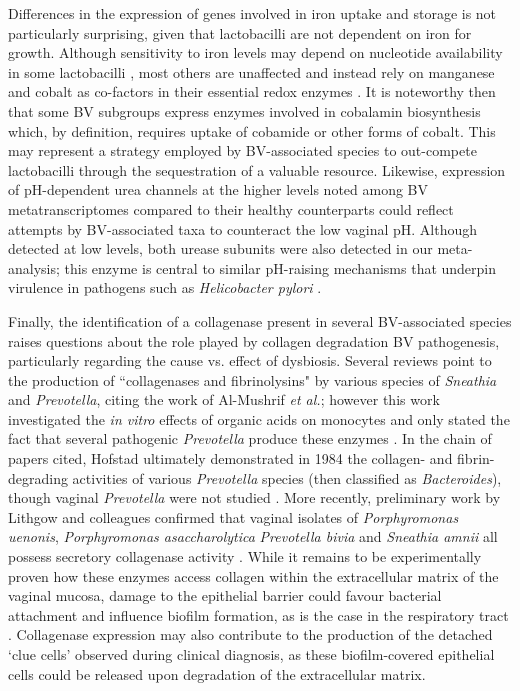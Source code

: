 \documentclass[sn-mathphys,Numbered]{sn-jnl}%
\begin{document}
Differences in the expression of genes involved in iron uptake and storage is not particularly surprising, given that lactobacilli are not dependent on iron for growth. Although sensitivity to iron levels may depend on nucleotide availability in some lactobacilli \citep{elli_iron_2000}, most others are unaffected and instead rely on manganese and cobalt as co-factors in their essential redox enzymes \citep{weinberg_lactobacillus_1997}. It is noteworthy then that some BV subgroups express enzymes involved in cobalamin biosynthesis which, by definition, requires uptake of cobamide or other forms of cobalt. This may represent a strategy employed by BV-associated species to out-compete lactobacilli through the sequestration of a valuable resource. Likewise, expression of pH-dependent urea channels at the higher levels noted among BV metatranscriptomes compared to their healthy counterparts could reflect attempts by BV-associated taxa to counteract the low vaginal pH. Although detected at low levels, both urease subunits were also detected in our meta-analysis; this enzyme is central to similar pH-raising mechanisms that underpin virulence in pathogens such as \textit{Helicobacter pylori} \citep{strugatsky_structure_2013}.

Finally, the identification of a collagenase present in several BV-associated species raises questions about the role played by collagen degradation BV pathogenesis, particularly regarding the cause vs. effect of dysbiosis. Several reviews \citep{onderdonk_human_2020,africa_anaerobes_2014} point to the production of ``collagenases and fibrinolysins" by various species of \textit{Sneathia} and \textit{Prevotella}, citing the work of Al-Mushrif \textit{et al.}; however this work investigated the \textit{in vitro} effects of organic acids on monocytes and only stated the fact that several pathogenic \textit{Prevotella} produce these enzymes \citep{al-mushrif_inhibition_2000}. In the chain of papers cited, Hofstad ultimately demonstrated in 1984 the collagen- and fibrin-degrading activities of various \textit{Prevotella} species (then classified as \textit{Bacteroides}), though vaginal \textit{Prevotella} were not studied \citep{hofstad_pathogenicity_1984}. More recently, preliminary work by Lithgow and colleagues confirmed that vaginal isolates of \textit{Porphyromonas uenonis}, \textit{{Porphyromonas asaccharolytica}} \textit{Prevotella bivia} and \textit{Sneathia amnii} all possess secretory collagenase activity \citep{lithgow_collagenase_2022}. While it remains to be experimentally proven how these enzymes access collagen within the extracellular matrix of the vaginal mucosa, damage to the epithelial barrier could favour bacterial attachment and influence biofilm formation, as is the case in the respiratory tract \citep{boase_bacterial-induced_2013,chegini_destruction_2023}. Collagenase expression may also contribute to the production of the detached `clue cells' \citep{simoes2006clinical} observed during clinical diagnosis, as these biofilm-covered epithelial cells could be released upon degradation of the extracellular matrix.
\end{document}

